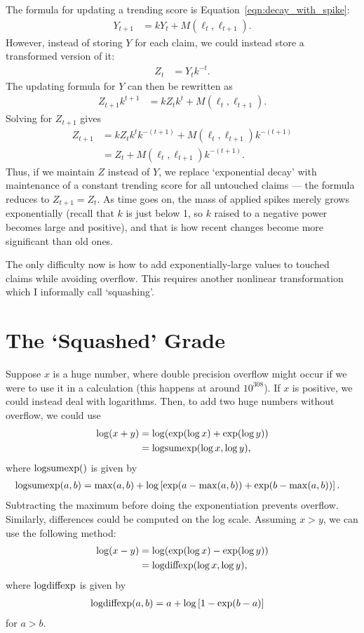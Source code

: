 \documentclass[a4paper, 12pt]{article}
\newcommand{\logsumexp}{\textnormal{logsumexp}}
\newcommand{\logdiffexp}{\textnormal{logdiffexp}}
\begin{document}
The formula for updating a trending score is Equation~\ref{eqn:decay_with_spike}:
\begin{align}
Y_{t+1} &= kY_t + M(\ell_t, \ell_{t+1}).
\end{align}
However, instead of storing $Y$ for each claim, we could instead store
a transformed version of it:
\begin{align}
Z_t &= Y_t k^{-t}.
\end{align}
The updating formula for $Y$ can then be rewritten as
\begin{align}
Z_{t+1} k^{t+1} &= kZ_t k^t + M(\ell_t, \ell_{t+1}).
\end{align}
Solving for $Z_{t+1}$ gives
\begin{align}
Z_{t+1} &= kZ_t k^t k^{-(t+1)} + M(\ell_t, \ell_{t+1})k^{-(t+1)} \\
        &= Z_t + M(\ell_t, \ell_{t+1})k^{-(t+1)}. \label{eqn:sparse_update}
\end{align}
Thus, if we maintain $Z$ instead of $Y$, 
we replace `exponential decay' with maintenance of a constant trending
score for all untouched claims --- the formula reduces to $Z_{t+1}=Z_t$.
As time goes on, the mass of applied spikes
merely grows exponentially (recall that $k$ is just below 1, so $k$
raised to a negative power becomes large and positive),
and that is how recent changes become more significant than old ones.

The only difficulty now is how to add exponentially-large values to touched
claims while avoiding overflow. This requires another nonlinear transformation
which I informally call `squashing'.

\section{The `Squashed' Grade}
Suppose $x$ is a huge number, where double precision overflow might occur if
we were to use it in a calculation (this happens at around $10^{308}$).
If $x$ is positive, we could instead deal with logarithms. Then, to add
two huge numbers without overflow, we could use
\begin{align}
\log(x + y)  &= \log(\exp(\log x) + \exp(\log y)) \\
             &= \logsumexp(\log x, \log y),
\end{align}
where $\logsumexp()$ is given by
\begin{align}
\logsumexp(a, b) &= \max(a, b)
        + \log\left[\exp(a - \max(a, b)) + \exp(b - \max(a, b))\right].
\end{align}
Subtracting the maximum before doing the exponentiation prevents overflow.
Similarly, differences could be computed on the log scale. Assuming $x>y$,
we can use the following method:
\begin{align}
\log(x - y)  &= \log(\exp(\log x) - \exp(\log y)) \\
             &= \logdiffexp(\log x, \log y),
\end{align}
where $\logdiffexp$ is given by
\begin{align}
\logdiffexp(a, b) &= a
        + \log\left[1 - \exp(b-a)\right]
\end{align}
for $a > b$.
\end{document}
